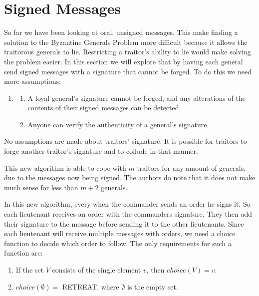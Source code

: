 \documentclass[10pt]{amsart}
\begin{document}
\section{Signed Messages}

So far we have been looking at oral, unsigned messages. This make finding a solution to the Byzantine
Generals Problem more difficult because it allows the traitorous generals to lie. Restricting a
traitor's ability to lie would make solving the problem easier. In this section we will explore that
by having each general send signed messages with a signature that cannot be forged. To do this we
need more assumptions:

\begin{enumerate}[label={A4.}]
    \item {
        \begin{enumerate}[label={(\alph*)}]
            \item {
                A loyal general's signature cannot be forged, and any alterations of the contents of
                their signed messages can be detected.
            }
            \item Anyone can verify the authenticity of a general's signature.
        \end{enumerate}
    }
\end{enumerate}

No assumptions are made about traitors' signature. It is possible for traitors to forge another
traitor's signature and to collude in that manner.

This new algorithm is able to cope with $m$ traitors for any amount of generals, due to the messages
now being signed. The authors do note that it does not make much sense for less than $m+2$ generals.

In this new algorithm, every when the commander sends an order he signs it. So each lieutenant receives
an order with the commanders signature. They then add their signature to the message before sending
it to the other lieutenants. Since each lieutenant will receive multiple messages with orders, we
need a choice function to decide which order to follow. The only requirements for such a function are:

\begin{enumerate}[label={\arabic{enumi}.}]
    \item If the set $V$ consists of the single element $v$, then $choice(V) = v$.
    \item $choice(\emptyset)=$ RETREAT, where $\emptyset$ is the empty set.
\end{enumerate}
\end{document}
